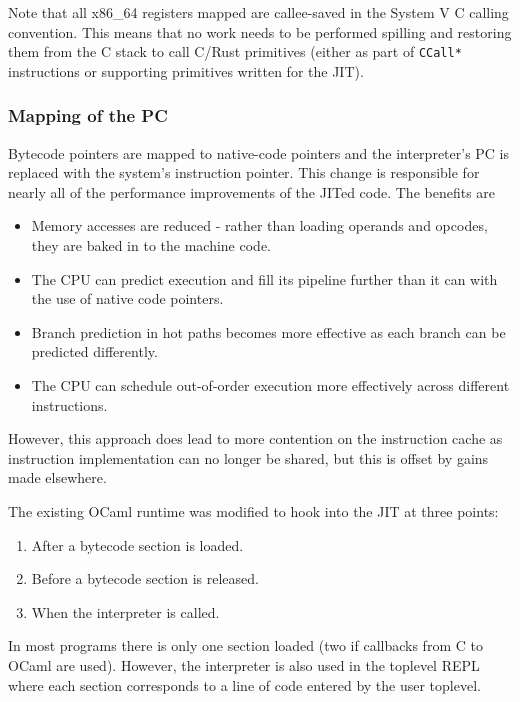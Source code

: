Note that all x86\_64 registers mapped are callee-saved in the System V C calling convention. This
means that no work needs to be performed spilling and restoring them from the C stack to call
C/Rust
primitives (either as part of \texttt{CCall*} instructions or supporting primitives written for the
JIT).

\subsubsection{Mapping of the PC}

Bytecode pointers are mapped to native-code pointers and the interpreter's PC is replaced with the
system's instruction pointer. This change is responsible for nearly all of the performance
improvements of the JITed code. The benefits are

\begin{itemize}
      \item Memory accesses are reduced - rather than loading operands and opcodes, they are baked
            in to the machine code.
      \item The CPU can predict execution and fill its pipeline further than it can with the use of
            native code pointers.
      \item Branch prediction in hot paths becomes more effective as each branch can be predicted
            differently.
      \item The CPU can schedule out-of-order execution more effectively across different
            instructions.
\end{itemize}

However, this approach does lead to more contention on the instruction cache as instruction
implementation can no longer be shared, but this is offset by gains made elsewhere.


The existing OCaml runtime was modified to hook into the JIT at three points:

\begin{enumerate}
      \item After a bytecode section is loaded.
      \item Before a bytecode section is released.
      \item When the interpreter is called.
\end{enumerate}

In most programs there is only one section loaded (two if callbacks from C to OCaml are
used). However, the interpreter is also used in the toplevel REPL where each section corresponds to
a line of code entered by the user toplevel.

